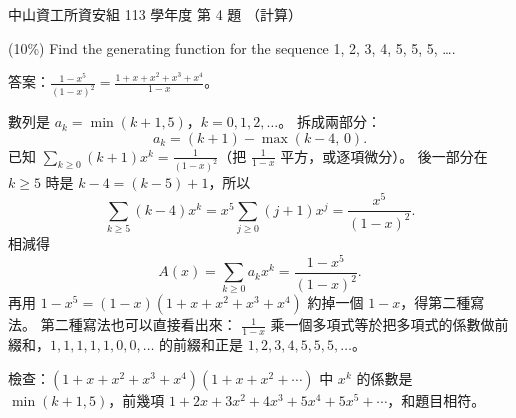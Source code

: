 \begin{pastexam}[label={px:nsysu-113-dmalg-04}]{中山資工所資安組 113 學年度 第 4 題}
（計算）

(10\%) Find the generating function for the sequence 1, 2, 3, 4, 5, 5, 5, \ldots.
\end{pastexam}

\begin{pastsoln}
答案：$\displaystyle \frac{1 - x^5}{(1 - x)^2} = \frac{1 + x + x^2 + x^3 + x^4}{1 - x}$。

數列是 $a_k = \min(k + 1, 5)$，$k = 0, 1, 2, \ldots$。 拆成兩部分：
\[
a_k = (k + 1) - \max(k - 4,\, 0) .
\]
已知 $\sum_{k \ge 0} (k + 1) x^k = \frac{1}{(1 - x)^2}$（把 $\frac{1}{1-x}$ 平方，或逐項微分）。 後一部分在
$k \ge 5$ 時是 $k - 4 = (k - 5) + 1$，所以
\[
\sum_{k \ge 5} (k - 4) x^k = x^5 \sum_{j \ge 0} (j + 1) x^j = \frac{x^5}{(1 - x)^2} .
\]
相減得
\[
A(x) = \sum_{k \ge 0} a_k x^k = \frac{1 - x^5}{(1 - x)^2} .
\]
再用 $1 - x^5 = (1 - x)(1 + x + x^2 + x^3 + x^4)$ 約掉一個 $1 - x$，得第二種寫法。 第二種寫法也可以直接看出來：
$\frac{1}{1 - x}$ 乘一個多項式等於把多項式的係數做前綴和，$1, 1, 1, 1, 1, 0, 0, \ldots$ 的前綴和正是
$1, 2, 3, 4, 5, 5, 5, \ldots$。

檢查：$(1 + x + x^2 + x^3 + x^4)(1 + x + x^2 + \cdots)$ 中 $x^k$ 的係數是 $\min(k + 1, 5)$，前幾項
$1 + 2x + 3x^2 + 4x^3 + 5x^4 + 5x^5 + \cdots$，和題目相符。
\end{pastsoln}
